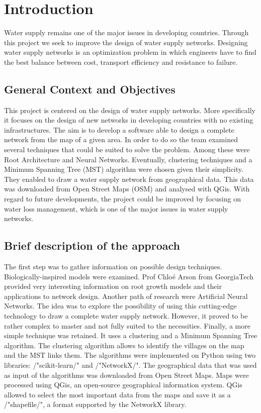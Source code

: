 \chapter{Introduction}
\label{Introduzione}
\thispagestyle{empty}




\parindent
Water supply remains one of the major issues in developing countries. Through this
project we seek to improve the design of water supply networks. Designing water supply
networks is an optimization problem in which engineers have to find the best balance
between cost, transport efficiency and resistance to failure.

\section{General Context and Objectives}
This project is centered on the design of water supply networks. More specifically it focuses on the design of new 
networks in developing countries with no existing infrastructures.
The aim is to develop a software able to design a complete network from the map of a given area.
In order to do so the team examined several techniques that could be suited to solve the problem.
Among these were Root Architecture and Neural Networks. Eventually, clustering techniques and a Minimum
Spanning Tree (MST) algorithm were chosen given their simplicity. They enabled to draw a water supply network 
from geographical data. This data was downloaded from Open Street Maps (OSM) and analysed with QGis.
With regard to future developments, the project could be improved by focusing on water loss management,
which is one of the major issues in water supply networks.

\section{Brief description of the approach}
The first step was to gather information on possible design techniques. Biologically-inspired models were
examined. Prof Chloé Arson from GeorgiaTech 
provided very interesting information on root growth models and their applications to network design.
Another path of research were Artificial Neural Networks. The idea was to explore the possibility of using
this cutting-edge technology to draw a complete water supply network. However, it proved to be rather complex
to master and not fully suited to the necessities.
Finally, a more simple technique was retained. It uses a clustering and a Minimum Spanning Tree algorithm.
The clustering algorithm allows to identify the villages on the map and the MST links them.
The algorithms were implemented on Python using two libraries: /"scikit-learn/" and /"NetworkX/".
The geographical data that was used as input of the algorithms was downloaded from Open Street Maps. 
Maps were processed using 
QGis, an open-source geographical information system. QGis allowed to select the most important 
data from the maps
and save it as a /"shapefile/", a format supported by the NetworkX library.


